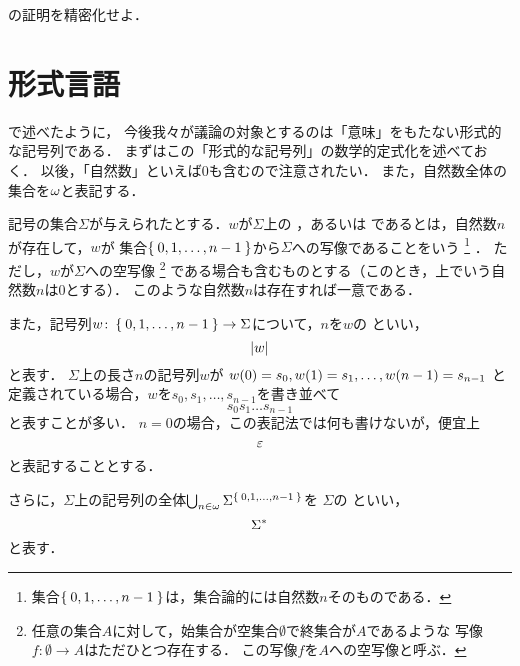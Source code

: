 \begin{Que} \label{que:proofinductivedefinition}
	の証明を精密化せよ．
\end{Que}

\section{形式言語} \label{sec:formallanguage}

で述べたように，
今後我々が議論の対象とするのは「意味」をもたない形式的な記号列である．
まずはこの「形式的な記号列」の数学的定式化を述べておく．
以後，「自然数」といえば0も含むので注意されたい．%
%
また，自然数全体の集合を\(\omega\)と表記する．

\begin{Def} \label{Def:formallanguage}
	記号の集合\(\Sigma\)が与えられたとする．\(w\)が\(\Sigma\)上の%
	，あるいは%
	であるとは，自然数\(n\)が存在して，\(w\)が
	集合\(\Set{0, 1, \dots, n-1}\)から\(\Sigma\)への写像であることをいう%
	\footnote{%
		集合\(\Set{0,1,\dots, n-1}\)は，集合論的には自然数\(n\)そのものである．
	}%
	．
	ただし，\(w\)が\(\Sigma\)への空写像%
	\footnote{%
		任意の集合\(A\)に対して，始集合が空集合\(\emptyset\)で終集合が\(A\)であるような
		写像\(f \colon \emptyset \to A\)はただひとつ存在する．%
		この写像\(f\)を\(A\)への空写像と呼ぶ．
	}%
	である場合も含むものとする（このとき，上でいう自然数\(n\)は0とする）．
	このような自然数\(n\)は存在すれば一意である．

	また，記号列\(w \colon \Set{0, 1, \dots, n-1} \to \Sigma\)について，\(n\)を\(w\)の%
	といい，%
	\begin{equation}
		\length{w}
		\label{eq:lengthforstring}
	\end{equation}
	と表す．
	\(\Sigma\)上の長さ\(n\)の記号列\(w\)が
	\(\apply{w}{0} = s_0, \apply{w}{1} = s_1, \dots, \apply{w}{n-1} = s_{n-1}\)
	と定義されている場合，\(w\)を\(s_0, s_1, \dots, s_{n-1}\)を書き並べて%
	\begin{equation}
		s_0 s_1 \dots s_{n-1}
	\end{equation}
	と表すことが多い．
	\(n = 0\)の場合，この表記法では何も書けないが，便宜上%
	\begin{equation}
		\varepsilon
		\label{eq:emptystring}
	\end{equation}
	と表記することとする．

	さらに，\(\Sigma\)上の記号列の全体\(\bigcup_{n \in \omega} \Sigma^{\Set{0,1,\dots, n-1}}\)を
	\(\Sigma\)の%
	といい，%
	\begin{equation}
		{\Sigma}^{\ast}
		\label{eq:KleeneClosure}
	\end{equation}
	と表す．
\end{Def}

